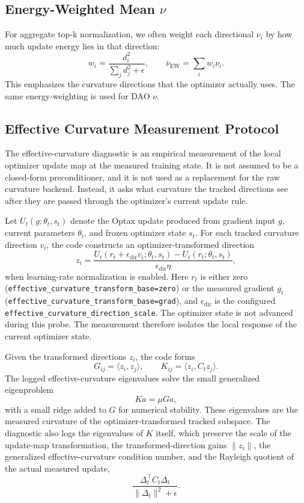 \documentclass[11pt]{article}
\begin{document}
\subsection{Energy-Weighted Mean \texorpdfstring{$\nu$}{nu}}

For aggregate top-k normalization, we often weight each directional $\nu_i$ by
how much update energy lies in that direction:
\[
    w_i = \frac{d_i^2}{\sum_j d_j^2 + \epsilon},
\qquad
    \overline{\nu}_{\mathrm{EW}}
    = \sum_i w_i \nu_i.
\]
This emphasizes the curvature directions that the optimizer actually uses.
The same energy-weighting is used for DAO $\nu$.

\subsection{Effective Curvature Measurement Protocol}

The effective-curvature diagnostic is an empirical measurement of the local
optimizer update map at the measured training state. It is not assumed to be a
closed-form preconditioner, and it is not used as a replacement for the raw
curvature backend. Instead, it asks what curvature the tracked directions see
after they are passed through the optimizer's current update rule.

Let $U_t(g; \theta_t, s_t)$ denote the Optax update produced from gradient
input $g$, current parameters $\theta_t$, and frozen optimizer state $s_t$.
For each tracked curvature direction $v_i$, the code constructs an
optimizer-transformed direction
\[
    z_i =
    \frac{
        U_t(r_t + \epsilon_{\mathrm{dir}} v_i; \theta_t, s_t)
        - U_t(r_t; \theta_t, s_t)
    }{\epsilon_{\mathrm{dir}} \eta},
\]
when learning-rate normalization is enabled. Here $r_t$ is either zero
(\texttt{effective\_curvature\_transform\_base=zero}) or the measured gradient
$g_t$ (\texttt{effective\_curvature\_transform\_base=grad}), and
$\epsilon_{\mathrm{dir}}$ is the configured
\texttt{effective\_curvature\_direction\_scale}. The optimizer state is not
advanced during this probe. The measurement therefore isolates the local
response of the current optimizer state.

Given the transformed directions $z_i$, the code forms
\[
    G_{ij} = \langle z_i, z_j\rangle,
    \qquad
    K_{ij} = \langle z_i, C_t z_j\rangle.
\]
The logged effective-curvature eigenvalues solve the small generalized
eigenproblem
\[
    K a = \mu G a,
\]
with a small ridge added to $G$ for numerical stability. These eigenvalues are
the measured curvature of the optimizer-transformed tracked subspace. The
diagnostic also logs the eigenvalues of $K$ itself, which preserve the scale
of the update-map transformation, the transformed-direction gains
$\|z_i\|$, the generalized effective-curvature condition number, and the
Rayleigh quotient of the actual measured update,
\[
    \frac{\Delta_t^\top C_t \Delta_t}{\|\Delta_t\|^2+\epsilon}.
\]
\end{document}
